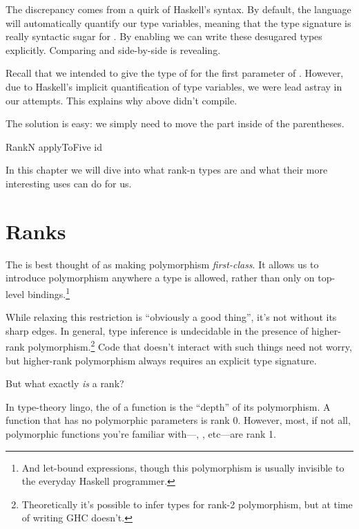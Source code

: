 \documentclass[book.tex]{subfiles}
\begin{document}
The discrepancy comes from a quirk of Haskell's syntax. By default, the language
will automatically quantify our type variables, meaning that the type signature
 is really syntactic sugar for . By enabling
 we can write these desugared types explicitly. Comparing
 and  side-by-side is revealing.


Recall that we intended to give the type of  for the first parameter of
. However, due to Haskell's implicit quantification of type
variables, we were lead astray in our attempts. This explains why
 above didn't compile.

The solution is easy: we simply need to move the  part inside of
the parentheses.


\begin{dorepl}{RankN}
applyToFive id
\end{dorepl}

In this chapter we will dive into what rank-n types are and what their more
interesting uses can do for us.


\section{Ranks}

The  is best thought of as making polymorphism
\emph{first-class}. It allows us to introduce polymorphism anywhere a type is
allowed, rather than only on top-level bindings.\footnote{And let-bound
expressions, though this polymorphism is usually invisible to the everyday
Haskell programmer.}

While relaxing this restriction is ``obviously a good thing'', it's not without
its sharp edges. In general, type inference is undecidable in the presence of
higher-rank polymorphism.\footnote{Theoretically it's possible to infer types
for rank-2 polymorphism, but at time of writing GHC doesn't.} Code that doesn't
interact with such things need not worry, but higher-rank polymorphism always
requires an explicit type signature.

But what exactly \emph{is} a rank?

In type-theory lingo, the  of a function is the ``depth'' of its
polymorphism. A function that has no polymorphic parameters is rank 0. However,
most, if not all, polymorphic functions you're familiar with---, \;,\; etc---are rank 1.
\end{document}
